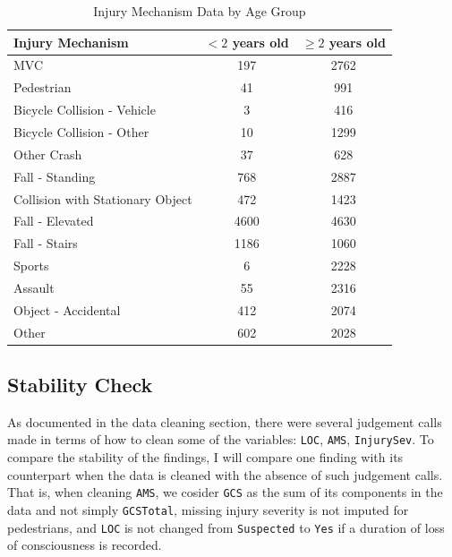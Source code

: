 \documentclass[10pt,letterpaper]{article}
\begin{document}
\begin{table}[htbp]
  \centering
  \begin{tabular}{l|c|c}
    \hline
    \textbf{Injury Mechanism} & \textbf{$<2$ years old} & \textbf{$\ge 2$ years old} \\
    \hline
    MVC & 197 & 2762 \\
    \hline
    Pedestrian & 41 & 991 \\
    \hline
    Bicycle Collision - Vehicle & \cellcolor{yellow!30}3 & 416 \\
    \hline
    Bicycle Collision - Other & \cellcolor{yellow!30}10 & 1299 \\
    \hline
    Other Crash & 37 & 628 \\
    \hline
    Fall - Standing & 768 & 2887 \\
    \hline
    Collision with Stationary Object & 472 & 1423 \\
    \hline
    Fall - Elevated & 4600 & 4630 \\
    \hline
    Fall - Stairs & 1186 & 1060 \\
    \hline
    Sports & \cellcolor{yellow!30}6 & 2228 \\
    \hline
    Assault & 55 & 2316 \\
    \hline
    Object - Accidental & 412& 2074 \\
    \hline
    Other & 602 & 2028 \\
    \hline
  \end{tabular}
  \caption{Injury Mechanism Data by Age Group}
  \label{tab:injury_mech}
\end{table}

\subsection{Stability Check}\label{stability-check}

As documented in the data cleaning section, there were several judgement calls made in terms of how to clean some of the variables: \texttt{LOC}, \texttt{AMS}, \texttt{InjurySev}. To compare the stability of the findings, I will compare one finding with its counterpart when the data is cleaned with the absence of such judgement calls. That is, when cleaning \texttt{AMS}, we cosider \texttt{GCS} as the sum of its components in the data and not simply \texttt{GCSTotal}, missing injury severity is not imputed for pedestrians, and \texttt{LOC} is not changed from \texttt{Suspected} to \texttt{Yes} if a duration of loss of consciousness is recorded.
\end{document}
